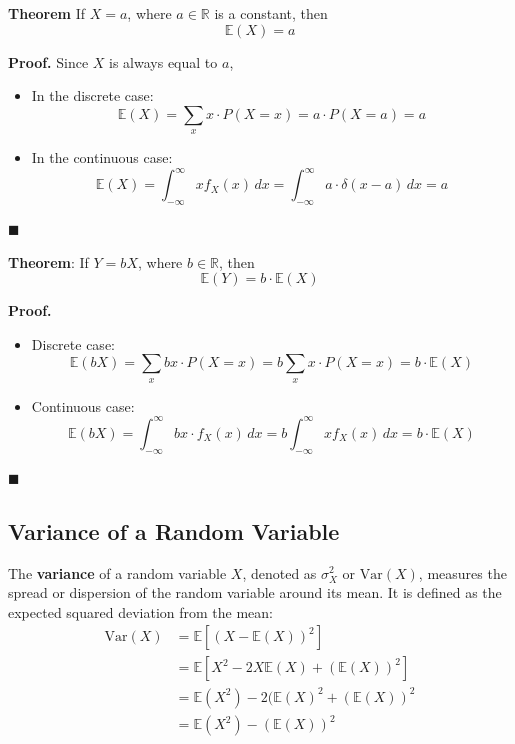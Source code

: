 \documentclass[twoside]{book}
\begin{document}
\begin{textbox}
\textbf{Theorem} If \( X = a \), where \( a \in \mathbb{R} \) is a constant, then
\[
\mathbb{E}(X) = a
\]
\end{textbox}

\textbf{Proof.}
Since \( X \) is always equal to \( a \),
\begin{itemize}
  \item In the discrete case:
  \[
  \mathbb{E}(X) = \sum_{x} x \cdot P(X = x) = a \cdot P(X = a) = a
  \]
  \item In the continuous case:
  \[
  \mathbb{E}(X) = \int_{-\infty}^{\infty} x f_X(x) \, dx = \int_{-\infty}^{\infty} a \cdot \delta(x - a) \, dx = a
  \]
\end{itemize}
\hfill\(\blacksquare\)

\vspace{1em}

\begin{textbox}
\textbf{Theorem}: If \( Y = bX \), where \( b \in \mathbb{R} \), then
\[
\mathbb{E}(Y) = b \cdot \mathbb{E}(X)
\]
\end{textbox}

\textbf{Proof.}
\begin{itemize}
  \item Discrete case:
  \[
  \mathbb{E}(bX) = \sum_{x} b x \cdot P(X = x) = b \sum_{x} x \cdot P(X = x) = b \cdot \mathbb{E}(X)
  \]
  \item Continuous case:
  \[
  \mathbb{E}(bX) = \int_{-\infty}^{\infty} b x \cdot f_X(x) \, dx = b \int_{-\infty}^{\infty} x f_X(x) \, dx = b \cdot \mathbb{E}(X)
  \]
\end{itemize}
\hfill\(\blacksquare\)


\subsection{Variance of a Random Variable}

The \textbf{variance} of a random variable \( X \), denoted as $\sigma_X^2$ or \( \text{Var}(X) \), measures the spread or dispersion of the random variable around its mean. It is defined as the expected squared deviation from the mean:
\begin{align*}
\text{Var}(X) &= \mathbb{E}[(X - \mathbb{E}(X))^2] \\
&=\mathbb{E}\left[ X^2 - 2X\mathbb{E}(X) + (\mathbb{E}(X))^2\right]  \\
&=\mathbb{E}(X^2)- 2(\mathbb{E}(X)^2 + (\mathbb{E}(X))^2 \\
&= \mathbb{E}(X^2) - (\mathbb{E}(X))^2
\end{align*}
\end{document}
